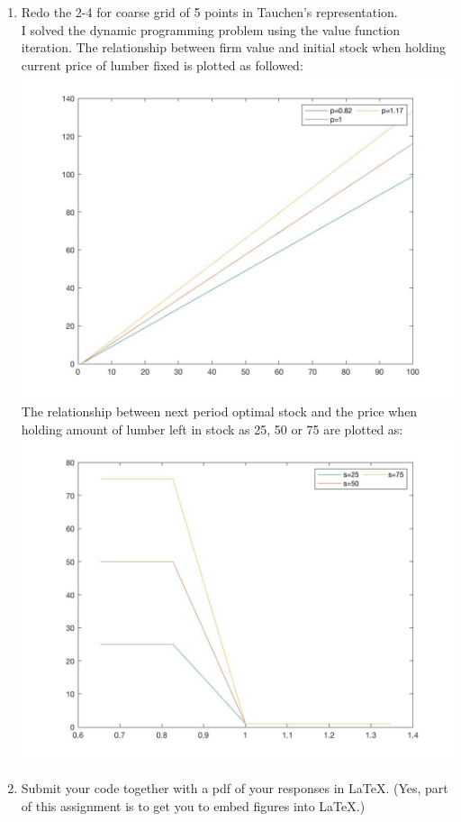 \documentclass[11pt]{article}
\begin{document}
\begin{enumerate}
\item Redo the 2-4 for coarse grid of 5 points in Tauchen's representation.\\[2em]

I solved the dynamic programming problem using the value function iteration. The relationship between firm value and initial stock when holding current price of lumber fixed is plotted as followed: \\
    \includegraphics[scale=0.2]{Vs0_5.jpg} \\
The relationship between next period optimal stock and the price when holding amount of lumber left in stock as 25, 50 or 75 are plotted as:\\
    \includegraphics[scale=0.2]{sp_5.jpg}

\item Submit your code together with a pdf of your responses in \LaTeX. (Yes, part of this assignment is to get you to embed figures into \LaTeX.)
\end{enumerate}
\end{document}
